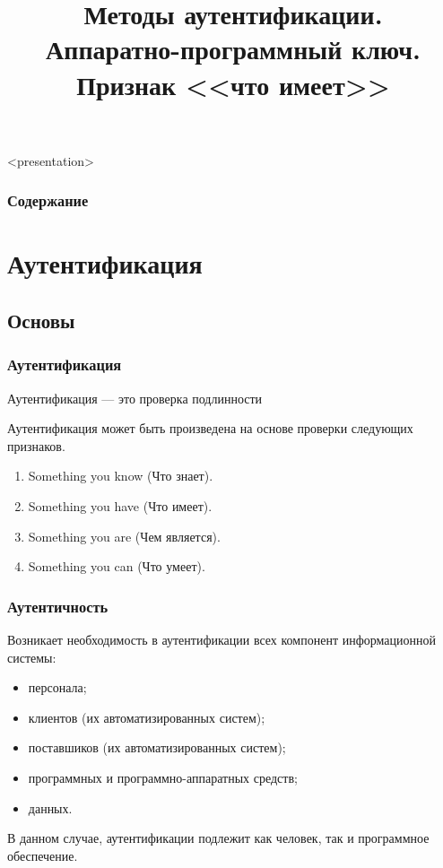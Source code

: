 
\title[Аппаратный ключ]{Методы аутентификации.\\Аппаратно-программный ключ.\\Признак <<что имеет>>}






\begin{frame}<presentation>
    \frametitle{Содержание}
    \tableofcontents
\end{frame}


\section{Аутентификация}


\subsection{Основы}


\begin{frame}
\frametitle{Аутентификация}
    \begin{definition}%
        \alert{Аутентификация} --- это проверка подлинности
    \end{definition}
    Аутентификация может быть произведена на основе проверки следующих признаков.
    \begin{enumerate}
        \item Something you know (Что знает).
        \item \alert{Something you have (Что имеет)}.
        \item Something you are (Чем является).
        \item Something you can (Что умеет).
    \end{enumerate}
\end{frame}


\begin{frame}
\frametitle{Аутентичность}
Возникает необходимость в аутентификации всех компонент информационной системы:
\begin{itemize}
    \item персонала;
    \item клиентов (их автоматизированных систем);
    \item поставшиков (их автоматизированных систем);
    \item программных и программно-аппаратных средств;
    \item данных.
\end{itemize}
В данном случае, аутентификации подлежит как человек, так и программное обеспечение.
\end{frame}


